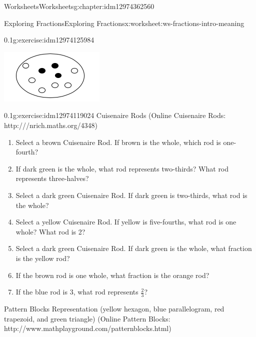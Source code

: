 \documentclass[twoside,11pt,]{book}
\begin{document}
\begin{chapterptx}{Worksheets}{}{Worksheets}{}{}{g:chapter:idm12974362560}
\begin{worksheet-section-numberless}{Exploring Fractions}{}{Exploring Fractions}{}{}{x:worksheet:ws-fractions-intro-meaning}
\begin{divisionexercise}{2}{}{0.1}{g:exercise:idm12974125984}
\begin{enumerate}[label=(\alph*)]
\begin{sidebyside}{1}{0.35}{0.35}{0}
\begin{sbspanel}{0.3}
\includegraphics[width=1\linewidth]{images/counters-one-third.png}
\end{sbspanel}%
\end{sidebyside}%
%
\end{enumerate}
\end{divisionexercise}%
\clearpage
\begin{divisionexercise}{3}{}{0.1}{g:exercise:idm12974119024}%
Cuisenaire Rods (Online Cuisenaire Rods: http:\slash{}\slash{}\slash{}nrich.maths.org\slash{}4348)%
%
\begin{enumerate}[label=(\alph*)]
\item{}Select a brown Cuisenaire Rod.  If brown is the whole, which rod is one-fourth?%
\item{}If dark green is the whole, what rod represents two-thirds? What rod represents three-halves?%
\item{}Select a dark green Cuisenaire Rod.  If dark green is two-thirds, what rod is the whole?%
\item{}Select a yellow Cuisenaire Rod.  If yellow is five-fourths, what rod is one whole? What rod is 2?%
\item{}Select a dark green Cuisenaire Rod.  If dark green is the whole, what fraction is the yellow rod?%
\item{}If the brown rod is one whole, what fraction is the orange rod?%
\item{}If the blue rod is 3, what rod represents \(\frac{2}{3} \)?%
\end{enumerate}
\end{divisionexercise}%
\begin{introduction}{}%
Pattern Blocks Representation (yellow hexagon, blue parallelogram, red trapezoid, and green triangle) (Online Pattern Blocks: http:\slash{}\slash{}www.mathplayground.com\slash{}patternblocks.html)%
\end{introduction}%

\end{worksheet-section-numberless}
\end{chapterptx}
\end{document}
